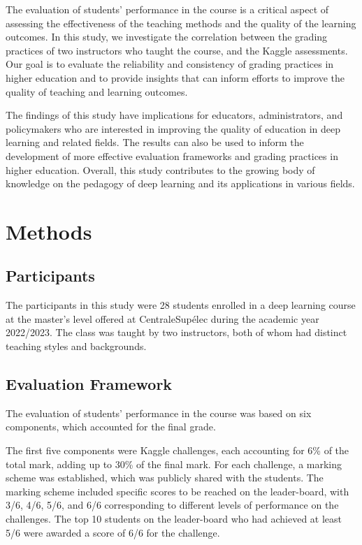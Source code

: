 \documentclass[a4paper]{article}
\begin{document}
The evaluation of students' performance in the course is a critical aspect of assessing the effectiveness of the teaching methods and the quality of the learning outcomes.
In this study, we investigate the correlation between the grading practices of two instructors who taught the course, and the Kaggle assessments.
Our goal is to evaluate the reliability and consistency of grading practices in higher education and to provide insights that can inform efforts to improve the quality of teaching and learning outcomes.

The findings of this study have implications for educators, administrators, and policymakers who are interested in improving the quality of education in deep learning and related fields.
The results can also be used to inform the development of more effective evaluation frameworks and grading practices in higher education.
Overall, this study contributes to the growing body of knowledge on the pedagogy of deep learning and its applications in various fields.



\section{Methods}
\subsection{Participants}
The participants in this study were 28 students enrolled in a deep learning course at the master's level offered at CentraleSupélec during the academic year 2022/2023.
The class was taught by two instructors, both of whom had distinct teaching styles and backgrounds.

\subsection{Evaluation Framework}
The evaluation of students' performance in the course was based on six components, which accounted for the final grade.

The first five components were Kaggle challenges, each accounting for 6\% of the total mark, adding up to 30\% of the final mark.
For each challenge, a marking scheme was established, which was publicly shared with the students.
The marking scheme included specific scores to be reached on the leader-board, with 3/6, 4/6, 5/6, and 6/6 corresponding to different levels of performance on the challenges.
The top 10 students on the leader-board who had achieved at least 5/6 were awarded a score of 6/6 for the challenge.
\end{document}
